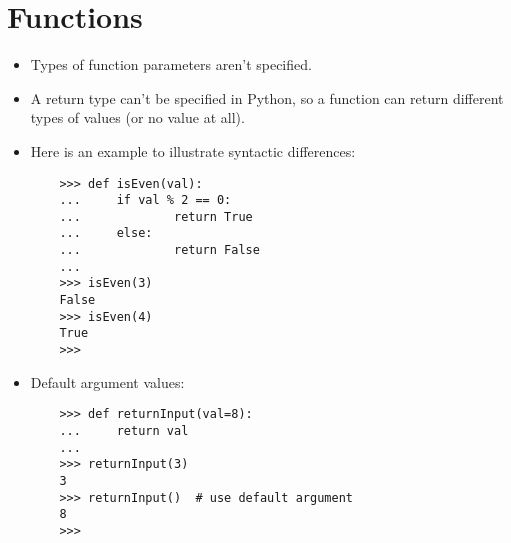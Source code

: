 \documentclass{article}
\begin{document}
\section{Functions}
\begin{itemize}
    \item Types of function parameters aren't specified.
    \item A return type can't be specified in Python, so a function can return different types of values (or no value at all).
    \item Here is an example to illustrate syntactic differences:
    \begin{lstlisting}
    >>> def isEven(val):
    ...     if val % 2 == 0:
    ...             return True
    ...     else:
    ...             return False
    ... 
    >>> isEven(3)
    False
    >>> isEven(4)
    True
    >>> 
    \end{lstlisting}
    \item Default argument values:
    \begin{lstlisting}
    >>> def returnInput(val=8):
    ...     return val
    ... 
    >>> returnInput(3)
    3
    >>> returnInput()  # use default argument
    8
    >>> 
    \end{lstlisting}
\end{itemize}
\end{document}
